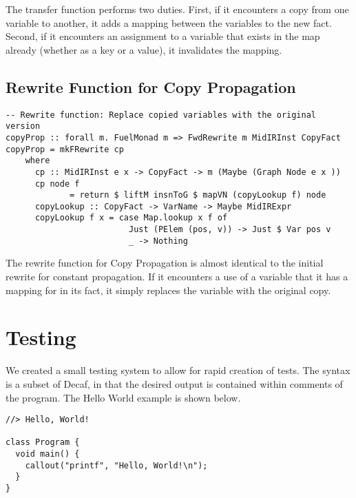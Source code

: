 \documentclass[11pt]{article}
\begin{document}
The transfer function performs two duties. First, if it encounters a copy from one variable to another, it adds a mapping between the variables to the new fact. Second, if it encounters an assignment to a variable that exists in the map already (whether as a key or a value), it invalidates the mapping. 

\subsection { Rewrite Function for Copy Propagation }

\begin{verbatim}
-- Rewrite function: Replace copied variables with the original version 
copyProp :: forall m. FuelMonad m => FwdRewrite m MidIRInst CopyFact 
copyProp = mkFRewrite cp 
    where 
      cp :: MidIRInst e x -> CopyFact -> m (Maybe (Graph Node e x ))
      cp node f 
             = return $ liftM insnToG $ mapVN (copyLookup f) node 
      copyLookup :: CopyFact -> VarName -> Maybe MidIRExpr 
      copyLookup f x = case Map.lookup x f of 
                         Just (PElem (pos, v)) -> Just $ Var pos v 
                         _ -> Nothing
\end{verbatim}

The rewrite function for Copy Propagation is almost identical to the initial rewrite for constant propagation. If it encounters a use of a variable that it has a mapping for in its fact, it simply replaces the variable with the original copy. 

\section{Testing}
We created a small testing system to allow for rapid creation of tests. The syntax is a subset of Decaf, in that the desired output is contained within comments of the program. The Hello World example is shown below.

\begin{verbatim}
//> Hello, World!

class Program {
  void main() {
    callout("printf", "Hello, World!\n");
  }
}
\end{verbatim}
\end{document}
